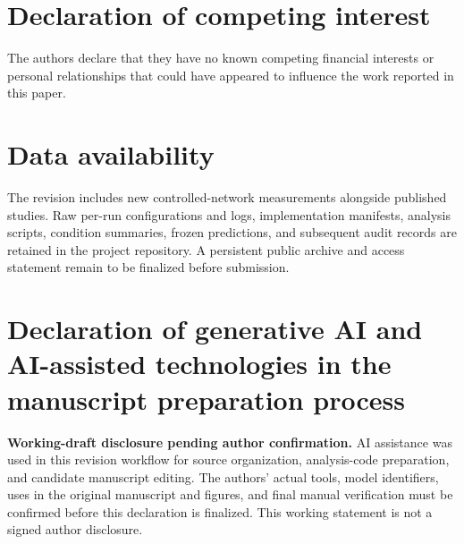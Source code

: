 \documentclass[a4paper,fleqn]{cas-sc}
\begin{document}
\section*{Declaration of competing interest}
The authors declare that they have no known competing financial interests or
personal relationships that could have appeared to influence the work reported
in this paper.

\section*{Data availability}
The revision includes new controlled-network measurements alongside published
studies. Raw per-run configurations and logs, implementation manifests,
analysis scripts, condition summaries, frozen predictions, and subsequent
audit records are retained in the project repository. A persistent public
archive and access statement remain to be finalized before submission.

\section*{Declaration of generative AI and AI-assisted technologies in the
manuscript preparation process}
\textbf{Working-draft disclosure pending author confirmation.}
AI assistance was used in this revision workflow for source organization,
analysis-code preparation, and candidate manuscript editing. The authors'
actual tools, model identifiers, uses in the original manuscript and figures,
and final manual verification must be confirmed before this declaration is
finalized. This working statement is not a signed author disclosure.

\printcredits



\end{document}
